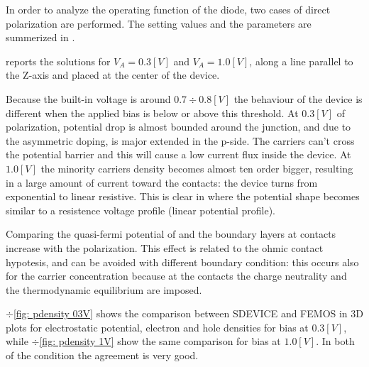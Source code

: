 In order to analyze the operating function of the diode, two cases of direct polarization are performed. The setting values and the parameters are summerized in . 




 reports the solutions for $V_A=0.3[V]$ and $V_A=1.0[V]$, along a line parallel to the Z-axis and placed at the center of the device. 

Because the built-in voltage is around $0.7 \div 0.8 [V]$ the behaviour of the device is different when the applied bias is below or above this threshold. 
At $0.3[V]$ of polarization, potential drop is almost bounded around the junction, and due to the asymmetric doping, is major extended in the p-side. The carriers can't cross the potential barrier and this will cause a low current flux inside the device.
At $1.0[V]$ the minority carriers density becomes almost ten order bigger, resulting in a large amount of current toward the contacts:  the device turns from exponential to linear resistive. This is clear in  where the potential shape becomes similar to a resistence voltage profile (linear potential profile).  

Comparing the quasi-fermi potential of  and  the boundary layers at contacts increase with the polarization. This effect is related to the ohmic contact hypotesis, and can be avoided with different boundary condition: this occurs also for the carrier concentration because at the contacts the charge neutrality and the thermodynamic equilibrium  are imposed.

$\div$\ref{fig: pdensity 03V} shows the comparison between SDEVICE and FEMOS in 3D plots for electrostatic potential, electron and hole densities for bias at $0.3[V]$, while $\div$\ref{fig: pdensity 1V} show the same comparison for bias at $1.0[V]$. In both of the condition the agreement is very good.


